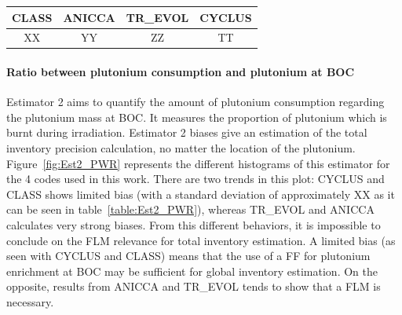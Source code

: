 \begin{table}[h]
	\begin{center}
		\begin{tabular}{|c||c||c||c|}
			\hline 
				CLASS & ANICCA & TR\_EVOL & CYCLUS \\
			\hline
				XX & YY & ZZ & TT \\
		\end{tabular}
	\end{center}
	\label{table:Est1_PWR}
\end{table}

\paragraph{Ratio between plutonium consumption and plutonium at \gls{BOC}}

Estimator 2 aims to quantify the amount of plutonium consumption regarding the
plutonium mass at \gls{BOC}. It measures the proportion of plutonium which is burnt
during irradiation. Estimator 2 biases give an estimation of the total inventory
precision calculation, no matter the location of the plutonium.
Figure~\ref{fig:Est2_PWR} represents the different histograms of this estimator
for the 4 codes used in this work. There are two trends in this plot: CYCLUS and
CLASS shows limited bias (with a standard deviation of approximately XX as it
can be seen in table~\ref{table:Est2_PWR}), whereas TR\_EVOL and ANICCA
calculates very strong biases. From this different behaviors, it is impossible
to conclude on the \gls{FLM} relevance for total inventory estimation. A limited bias
(as seen with CYCLUS and CLASS) means that the use of a \gls{FF} for plutonium
enrichment at \gls{BOC} may be sufficient for global inventory estimation. On the
opposite, results from ANICCA and TR\_EVOL tends to show that a \gls{FLM} is
necessary. 

